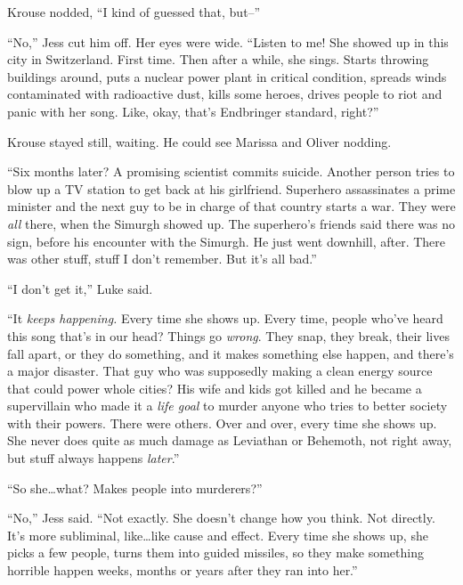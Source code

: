 Krouse nodded, ``I kind of guessed that, but--''



``No,'' Jess cut him off.  Her eyes were wide.  ``Listen to me!  She showed up in this city in Switzerland.  First time.  Then after a while, she sings.  Starts throwing buildings around, puts a nuclear power plant in critical condition, spreads winds contaminated with radioactive dust, kills some heroes, drives people to riot and panic with her song.  Like, okay, that's Endbringer standard, right?''



Krouse stayed still, waiting.  He could see Marissa and Oliver nodding.



``Six months later?  A promising scientist commits suicide.  Another person tries to blow up a TV station to get back at his girlfriend.  Superhero assassinates a prime minister and the next guy to be in charge of that country starts a war.  They were \emph{all} there, when the Simurgh showed up.  The superhero's friends said there was no sign, before his encounter with the Simurgh.  He just went downhill, after.  There was other stuff, stuff I don't remember.  But it's all bad.''



``I don't get it,'' Luke said.



``It \emph{keeps happening.  }Every time she shows up.  Every time, people who've heard this song that's in our head?  Things go \emph{wrong}.  They snap, they break, their lives fall apart, or they do something, and it makes something else happen, and there's a major disaster.  That guy who was supposedly making a clean energy source that could power whole cities?  His wife and kids got killed and he became a supervillain who made it a \emph{life goal} to murder anyone who tries to better society with their powers.  There were others.  Over and over, every time she shows up.  She never does quite as much damage as Leviathan or Behemoth, not right away, but stuff always happens \emph{later}.''



``So she\ldots what?  Makes people into murderers?''



``No,'' Jess said.  ``Not exactly.  She doesn't change how you think.  Not directly.  It's more subliminal, like\ldots like cause and effect.  Every time she shows up, she picks a few people, turns them into guided missiles, so they make something horrible happen weeks, months or years after they ran into her.''



